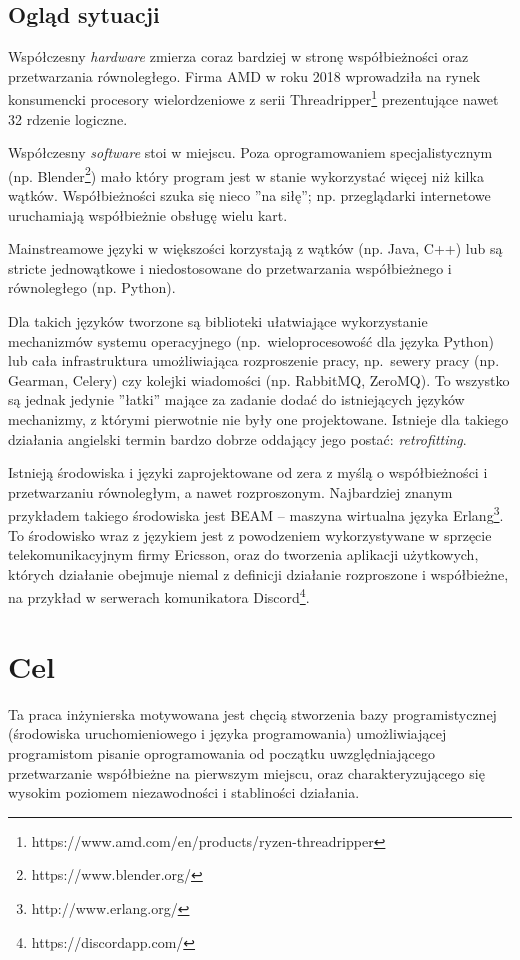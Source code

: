 \subsection{Ogląd sytuacji}

Współczesny \emph{hardware} zmierza coraz bardziej w stronę współbieżności oraz przetwarzania równoległego.
Firma AMD w roku 2018 wprowadziła na rynek konsumencki procesory wielordzeniowe z serii
Threadripper\footnote{https://www.amd.com/en/products/ryzen-threadripper} prezentujące nawet 32 rdzenie logiczne.

Współczesny \emph{software} stoi w miejscu. Poza oprogramowaniem specjalistycznym (np.
Blender\footnote{https://www.blender.org/}) mało który program jest w stanie wykorzystać więcej niż kilka wątków.
Współbieżności szuka się nieco ''na siłę''; np. przeglądarki internetowe uruchamiają współbieżnie obsługę
wielu kart.

Mainstreamowe języki w większości korzystają z wątków (np. Java, C++) lub są stricte jednowątkowe i
niedostosowane do przetwarzania współbieżnego i równoległego (np. Python).

Dla takich języków tworzone są biblioteki ułatwiające wykorzystanie mechanizmów systemu operacyjnego
(np.~wieloprocesowość dla języka Python) lub cała infrastruktura umożliwiająca rozproszenie pracy,
np.~sewery pracy (np. Gearman, Celery) czy kolejki wiadomości (np. RabbitMQ, ZeroMQ).
To wszystko są jednak jedynie ''łatki'' mające za zadanie dodać do istniejących języków mechanizmy, z którymi
pierwotnie nie były one projektowane. Istnieje dla takiego działania angielski termin bardzo dobrze oddający
jego postać: \emph{retrofitting}.

Istnieją środowiska i języki zaprojektowane od zera z myślą o współbieżności i przetwarzaniu równoległym, a
nawet rozproszonym.
Najbardziej znanym przykładem takiego środowiska jest BEAM -- maszyna wirtualna
języka Erlang\footnote{http://www.erlang.org/}. To środowisko wraz z językiem jest z powodzeniem
wykorzystywane w sprzęcie telekomunikacyjnym firmy Ericsson, oraz do tworzenia aplikacji użytkowych, których
działanie obejmuje niemal z definicji działanie rozproszone i współbieżne, na przykład w serwerach
komunikatora Discord\footnote{https://discordapp.com/}.

\section{Cel}

Ta praca inżynierska motywowana jest chęcią stworzenia bazy programistycznej (środowiska uruchomieniowego i
języka programowania) umożliwiającej programistom pisanie oprogramowania od początku uwzględniającego
przetwarzanie współbieżne na pierwszym miejscu, oraz charakteryzującego się wysokim poziomem niezawodności i
stabliności działania.

